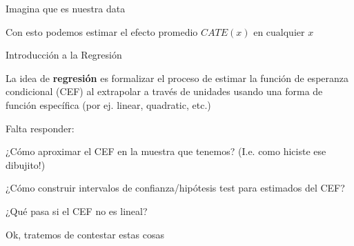 \documentclass[11pt,handout,aspectratio=169]{beamer}
\newenvironment{wideitemize}{\itemize\addtolength{\itemsep}{10pt}}{\enditemize}
\newenvironment{wideitemizeshort}{\itemize}{\enditemize}
\begin{document}
\begin{frame}
\begin{wideitemizeshort}
 {\item
Imagina que es nuestra data }



\smallskip



\item<9>
Con esto podemos estimar el efecto promedio $CATE(x)$ en cualquier $x$
\end{wideitemizeshort}
\end{frame}


\begin{frame}{Introducción a la Regresión}
\begin{wideitemize}

\item
La idea de \textbf{regresión} es formalizar el proceso de estimar la función de esperanza condicional (CEF) al extrapolar a través de unidades usando una forma de función específica  (por ej. linear, quadratic, etc.)

\pause
\item
Falta responder:

\pause
\item
¿Cómo aproximar el CEF en la muestra que tenemos? (I.e. como hiciste ese dibujito!)

\pause
\item
¿Cómo construir intervalos de confianza/hipótesis test para estimados del CEF? 

\pause
\item
¿Qué pasa si el CEF no es lineal?

\pause
\item
Ok, tratemos de contestar estas cosas

\end{wideitemize}	
\end{frame}	
\end{document}
